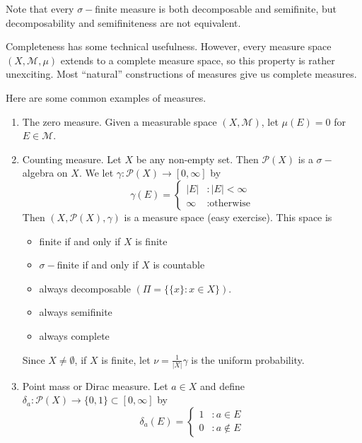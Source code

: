 \documentclass[11pt, a4paper]{memoir}
\theoremstyle{change}
\theoremstyle{plain}
\theoremstyle{nonumberplain}
\numberwithin{equation}{section}
\begin{document}
Note that every $\sigma-$finite measure is both decomposable and semifinite, but decomposability and semifiniteness are not equivalent.

Completeness has some technical usefulness.
However, every measure space $(X,\mathcal{M},\mu)$ extends to a complete measure space, so this property is rather unexciting.
Most ``natural'' constructions of measures give us complete measures.

Here are some common examples of measures.
\begin{enumerate}
    \item The zero measure.
        Given a measurable space $(X,\mathcal{M})$, let $\mu(E)=0$ for $E\in\mathcal{M}$.
    \item Counting measure.
        Let $X$ be any non-empty set.
        Then $\mathcal{P}(X)$ is a $\sigma-$algebra on $X$.
        We let $\gamma:\mathcal{P}(X)\to[0,\infty]$ by
        \begin{equation*}
            \gamma(E)=
            \begin{cases}
                |E| &: |E|<\infty\\
                \infty &: \text{otherwise}
            \end{cases}
        \end{equation*}
        Then $(X,\mathcal{P}(X),\gamma)$ is a measure space (easy exercise).
        This space is
        \begin{itemize}[nolistsep]
            \item finite if and only if $X$ is finite
            \item $\sigma-$finite if and only if $X$ is countable
            \item always decomposable $(\Pi=\{\{x\}:x\in X\})$.
            \item always semifinite
            \item always complete
        \end{itemize}
        Since $X\neq\emptyset$, if $X$ is finite, let $\nu=\frac{1}{|X|}\gamma$ is the uniform probability.
    \item Point mass or Dirac measure.
        Let $a\in X$ and define $\delta_a:\mathcal{P}(X)\to\{0,1\}\subset[0,\infty]$ by
        \begin{equation*}
            \delta_a(E)=
            \begin{cases}
                1 &: a\in E\\
                0 &: a\notin E
            \end{cases}

\end{equation*}
\end{enumerate}
\end{document}

